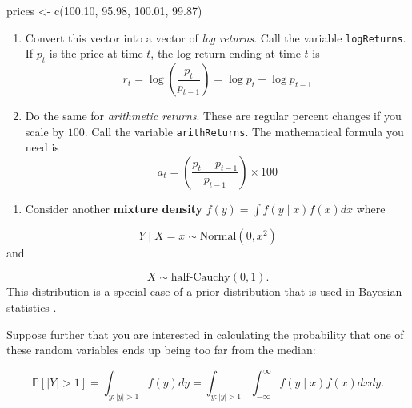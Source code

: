 \documentclass[
  12pt,
  krantz2]{krantz}
\makeatletter
\newenvironment{Shaded}{\begin{snugshade}}{\end{snugshade}}
\newcommand{\FloatTok}[1]{\textcolor[rgb]{0.06,0.06,0.06}{#1}}
\newcommand{\FunctionTok}[1]{\textcolor[rgb]{0,0,0}{#1}}
\newcommand{\NormalTok}[1]{#1}
\newcommand{\OtherTok}[1]{\textcolor[rgb]{0.37,0.37,0.37}{#1}}
\providecommand{\tightlist}{%
  \setlength{\itemsep}{0pt}\setlength{\parskip}{0pt}}
\newenvironment{kframe}{%
\medskip{}
\setlength{\fboxsep}{.8em}
 \def\at@end@of@kframe{}%
 \ifinner\ifhmode%
  \def\at@end@of@kframe{\end{minipage}}%
  \begin{minipage}{\columnwidth}%
 \fi\fi%
 \def\FrameCommand##1{\hskip\@totalleftmargin \hskip-\fboxsep
 \colorbox{shadecolor}{##1}\hskip-\fboxsep
     \hskip-\linewidth \hskip-\@totalleftmargin \hskip\columnwidth}%
 \MakeFramed {\advance\hsize-\width
   \@totalleftmargin\z@ \linewidth\hsize
   \@setminipage}}%
 {\par\unskip\endMakeFramed%
 \at@end@of@kframe}
\renewenvironment{Shaded}{\begin{kframe}}{\end{kframe}}
\makeatother
\begin{document}
\begin{Shaded}
\begin{Highlighting}[]
\NormalTok{prices }\OtherTok{\textless{}{-}} \FunctionTok{c}\NormalTok{(}\FloatTok{100.10}\NormalTok{, }\FloatTok{95.98}\NormalTok{, }\FloatTok{100.01}\NormalTok{, }\FloatTok{99.87}\NormalTok{)}
\end{Highlighting}
\end{Shaded}

\begin{enumerate}
\def\labelenumi{\alph{enumi}.}
\item
  Convert this vector into a vector of \emph{log returns}. Call the variable \texttt{logReturns}. If \(p_t\) is the price at time \(t\), the log return ending at time \(t\) is
  \[ r_t = \log \left( \frac{p_t}{p_{t-1}} \right) = \log p_t - \log p_{t-1}\]
\item
  Do the same for \emph{arithmetic returns}. These are regular percent changes if you scale by \(100\). Call the variable \texttt{arithReturns}. The mathematical formula you need is \[ a_t = \left( \frac{p_t - p_{t-1} }{p_{t-1}} \right) \times 100 \]
\end{enumerate}

\begin{enumerate}
\def\labelenumi{\arabic{enumi}.}
\setcounter{enumi}{2}
\tightlist
\item
  Consider another \textbf{mixture density} \(f(y) = \int f(y \mid x) f(x) dx\) where
\end{enumerate}

\[
Y \mid X = x \sim \text{Normal}(0, x^2)
\]
and

\[
X \sim \text{half-Cauchy}(0, 1).
\]
This distribution is a special case of a prior distribution that is used in Bayesian statistics \citep{horseshoe}.

Suppose further that you are interested in calculating the probability that one of these random variables ends up being too far from the median:

\[
\mathbb{P}[|Y| > 1] = \int_{y : |y| > 1} f(y)dy = \int_{y : |y| > 1} \int_{-\infty}^\infty  f(y \mid x) f(x) dx dy.
\]
\end{document}
